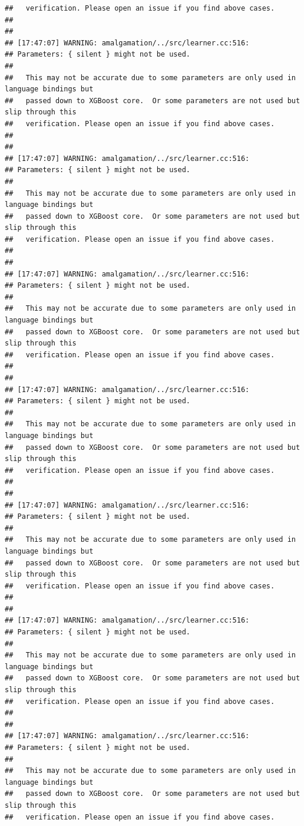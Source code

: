 \documentclass[AMS,STIX2COL]{WileyNJD-v2}\usepackage[]{graphicx}\usepackage[]{color}
\makeatletter
\newenvironment{kframe}{%
 \def\at@end@of@kframe{}%
 \ifinner\ifhmode%
  \def\at@end@of@kframe{\end{minipage}}%
  \begin{minipage}{\columnwidth}%
 \fi\fi%
 \def\FrameCommand##1{\hskip\@totalleftmargin \hskip-\fboxsep
 \colorbox{shadecolor}{##1}\hskip-\fboxsep
     \hskip-\linewidth \hskip-\@totalleftmargin \hskip\columnwidth}%
 \MakeFramed {\advance\hsize-\width
   \@totalleftmargin\z@ \linewidth\hsize
   \@setminipage}}%
 {\par\unskip\endMakeFramed%
 \at@end@of@kframe}
\newenvironment{knitrout}{}{} %
\makeatother
\begin{document}
\begin{knitrout}
\begin{kframe}
\begin{verbatim}
##   verification. Please open an issue if you find above cases.
## 
## 
## [17:47:07] WARNING: amalgamation/../src/learner.cc:516: 
## Parameters: { silent } might not be used.
## 
##   This may not be accurate due to some parameters are only used in language bindings but
##   passed down to XGBoost core.  Or some parameters are not used but slip through this
##   verification. Please open an issue if you find above cases.
## 
## 
## [17:47:07] WARNING: amalgamation/../src/learner.cc:516: 
## Parameters: { silent } might not be used.
## 
##   This may not be accurate due to some parameters are only used in language bindings but
##   passed down to XGBoost core.  Or some parameters are not used but slip through this
##   verification. Please open an issue if you find above cases.
## 
## 
## [17:47:07] WARNING: amalgamation/../src/learner.cc:516: 
## Parameters: { silent } might not be used.
## 
##   This may not be accurate due to some parameters are only used in language bindings but
##   passed down to XGBoost core.  Or some parameters are not used but slip through this
##   verification. Please open an issue if you find above cases.
## 
## 
## [17:47:07] WARNING: amalgamation/../src/learner.cc:516: 
## Parameters: { silent } might not be used.
## 
##   This may not be accurate due to some parameters are only used in language bindings but
##   passed down to XGBoost core.  Or some parameters are not used but slip through this
##   verification. Please open an issue if you find above cases.
## 
## 
## [17:47:07] WARNING: amalgamation/../src/learner.cc:516: 
## Parameters: { silent } might not be used.
## 
##   This may not be accurate due to some parameters are only used in language bindings but
##   passed down to XGBoost core.  Or some parameters are not used but slip through this
##   verification. Please open an issue if you find above cases.
## 
## 
## [17:47:07] WARNING: amalgamation/../src/learner.cc:516: 
## Parameters: { silent } might not be used.
## 
##   This may not be accurate due to some parameters are only used in language bindings but
##   passed down to XGBoost core.  Or some parameters are not used but slip through this
##   verification. Please open an issue if you find above cases.
## 
## 
## [17:47:07] WARNING: amalgamation/../src/learner.cc:516: 
## Parameters: { silent } might not be used.
## 
##   This may not be accurate due to some parameters are only used in language bindings but
##   passed down to XGBoost core.  Or some parameters are not used but slip through this
##   verification. Please open an issue if you find above cases.

\end{verbatim}
\end{kframe}
\end{knitrout}
\end{document}
